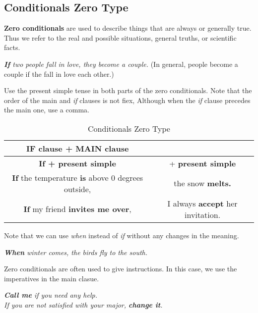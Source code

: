 \documentclass[hidelinks,10pt,a4paper]{article}
\begin{document}
\subsection{Conditionals Zero Type}
\textbf{Zero conditionals} are used to describe things that are always or generally true. Thus we refer to the real and possible situations, general truths, or scientific facts.

\begin{center}
	\textit{\textbf{If} two people fall in love, they become a couple.} (In general, people become a couple if the fall in love each other.)
\end{center}

Use the present simple tense in both parts of the zero conditionals. Note that the order of the main and \textit{if} clauses is not fiex, Although when the \textit{if} clause precedes the main one, use a comma.

\begin{table}[h]
\begin{center}
\begin{tabular}{|c|c|}
	\hline
	\textbf{IF clause} + \textbf{MAIN clause} \\ \hline
	\textbf{If + present simple} & + \textbf{present simple} \\ \hline
	\textbf{If} the temperature \textbf{is} above 0 degrees outside, & the snow \textbf{melts.} \\ \hline
	\textbf{If} my friend \textbf{invites me over}, & I always \textbf{accept}   her invitation. \\ \hline
\end{tabular}
\end{center}
\caption{Conditionals Zero Type} \label{tab:czt}
\end{table}

Note that we can use \textit{when} instead of \textit{if} without any changes in the meaning.

\begin{center}
	\textit{\textbf{When} winter comes, the birds fly to the south. }
\end{center}

Zero conditionals are often used to give instructions. In this case, we use the imperatives in the main clasue.

\begin{center}
	\textit{\textbf{Call me} if you need any help.}\\
	\textit{If you are not satisfied with your major, \textbf{change it}. }
\end{center}
\end{document}
